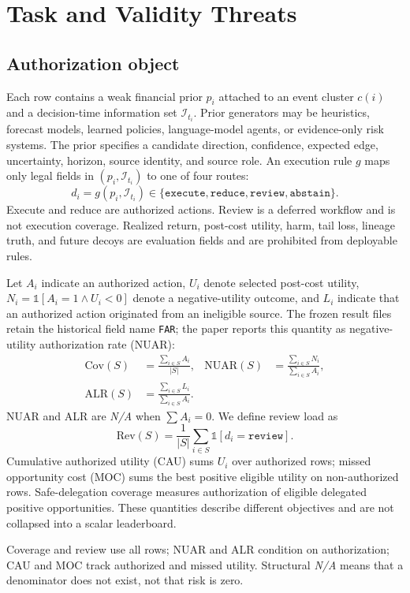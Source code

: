 \section{Task and Validity Threats}

\subsection{Authorization object}
Each row contains a weak financial prior $p_i$ attached to an event cluster $c(i)$ and a decision-time information set $\mathcal{I}_{t_i}$. Prior generators may be heuristics, forecast models, learned policies, language-model agents, or evidence-only risk systems. The prior specifies a candidate direction, confidence, expected edge, uncertainty, horizon, source identity, and source role. An execution rule $g$ maps only legal fields in $(p_i,\mathcal{I}_{t_i})$ to one of four routes:
\[
  d_i=g(p_i,\mathcal{I}_{t_i})\in\{\texttt{execute},\texttt{reduce},\texttt{review},\texttt{abstain}\}.
\]
Execute and reduce are authorized actions. Review is a deferred workflow and is not execution coverage. Realized return, post-cost utility, harm, tail loss, lineage truth, and future decoys are evaluation fields and are prohibited from deployable rules.

Let $A_i$ indicate an authorized action, $U_i$ denote selected post-cost utility, $N_i=\mathbb{1}[A_i=1\land U_i<0]$ denote a negative-utility outcome, and $L_i$ indicate that an authorized action originated from an ineligible source. The frozen result files retain the historical field name \texttt{FAR}; the paper reports this quantity as negative-utility authorization rate (NUAR):
\[
 \begin{aligned}
 \mathrm{Cov}(S)&=\frac{\sum_{i\in S}A_i}{|S|}, &
 \mathrm{NUAR}(S)&=\frac{\sum_{i\in S}N_i}{\sum_{i\in S}A_i},\\
 \mathrm{ALR}(S)&=\frac{\sum_{i\in S}L_i}{\sum_{i\in S}A_i}.
 \end{aligned}
\]
NUAR and ALR are \textit{N/A} when $\sum A_i=0$. We define review load as
\[
 \mathrm{Rev}(S)=\frac{1}{|S|}\sum_{i\in S}\mathbb{1}[d_i=\texttt{review}].
\]
Cumulative authorized utility (CAU) sums $U_i$ over authorized rows; missed opportunity cost (MOC) sums the best positive eligible utility on non-authorized rows. Safe-delegation coverage measures authorization of eligible delegated positive opportunities. These quantities describe different objectives and are not collapsed into a scalar leaderboard.

Coverage and review use all rows; NUAR and ALR condition on authorization; CAU and MOC track authorized and missed utility. Structural \textit{N/A} means that a denominator does not exist, not that risk is zero.

